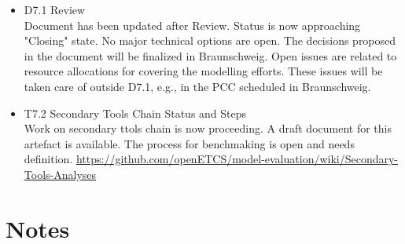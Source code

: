 \documentclass[a4paper, 11pt]{article}
\begin{document}
\begin{itemize}
\item D7.1 Review\\
Document has been updated after Review. Status is now approaching "Closing" state. No major technical options are open. The decisions proposed in the document will be finalized in Braunschweig. Open issues are related to resource allocations for covering the modelling efforts. These issues will be taken care of outside D7.1, e.g., in the PCC scheduled in Braunschweig.\\

\item T7.2 Secondary Tools Chain Status and Steps\\
Work on secondary ttols chain is now proceeding. A draft document for this artefact is available. The process for benchmaking is open and needs definition.
\url{https://github.com/openETCS/model-evaluation/wiki/Secondary-Tools-Analyses}
\end{itemize}

\section{Notes}
\end{document}
